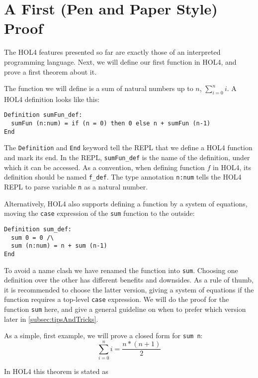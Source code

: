 \section{A First (Pen and Paper Style) Proof}\label{sec:hol_ex1}
%
The HOL4 features presented so far are exactly those of an interpreted
programming language.
Next, we will define our first function in HOL4, and prove a first theorem about
it.

The function we will define is a sum of natural numbers up to $n$,
$\sum_{i=0}^n i$.
A HOL4 definition looks like this:

\begin{lstlisting}
Definition sumFun_def:
  sumFun (n:num) = if (n = 0) then 0 else n + sumFun (n-1)
End
\end{lstlisting}

The \lstinline{Definition} and \lstinline{End} keyword tell the REPL that we
define a HOL4 function and mark its end.
In the REPL, \lstinline{sumFun_def} is the name of the definition, under which it
can be accessed.
As a convention, when defining function $f$ in HOL4, its definition should be
named \lstinline{f_def}.
The type annotation \lstinline{n:num} tells the HOL4 REPL to parse variable \texttt{n}
as a natural number.

Alternatively, HOL4 also supports defining a function by a system of equations,
moving the \texttt{case} expression of the \lstinline{sum} function to the
outside:
%
\begin{lstlisting}
Definition sum_def:
  sum 0 = 0 /\
  sum (n:num) = n + sum (n-1)
End
\end{lstlisting}

To avoid a name clash we have renamed the function into \lstinline{sum}.
Choosing one definition over the other has different benefits and downsides.
As a rule of thumb, it is recommended to choose the latter version, giving a
system of equations if the function requires a top-level \texttt{case}
expression.
We will do the proof for the function \texttt{sum} here, and give a general
guideline on when to prefer which version later in \autoref{subsec:tipsAndTricks}.

As a simple, first example, we will prove a closed form for \lstinline{sum n}:
\[
  \sum_{i=0}^{n} i = \frac{n * (n + 1)}{2}
\]

In HOL4 this theorem is stated as

